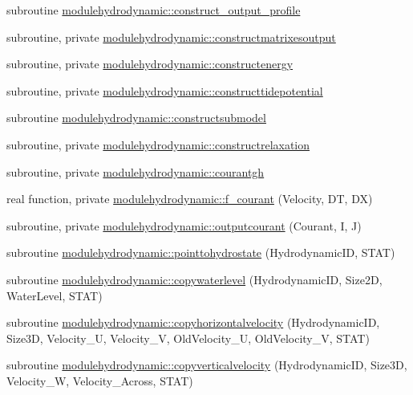\begin{DoxyCompactItemize}
subroutine \mbox{\hyperlink{namespacemodulehydrodynamic_aa3b8aa943159cc40b65537cff1888b6e}{modulehydrodynamic\+::construct\+\_\+output\+\_\+profile}}
\item 
subroutine, private \mbox{\hyperlink{namespacemodulehydrodynamic_a40ae80918927a7eb25c954cec3bd2b40}{modulehydrodynamic\+::constructmatrixesoutput}}
\item 
subroutine, private \mbox{\hyperlink{namespacemodulehydrodynamic_a048299b4cfb1c4c013ad653ff9e85f70}{modulehydrodynamic\+::constructenergy}}
\item 
subroutine, private \mbox{\hyperlink{namespacemodulehydrodynamic_a2a52e863aeb7df55203e4f6646d9b4a5}{modulehydrodynamic\+::constructtidepotential}}
\item 
subroutine \mbox{\hyperlink{namespacemodulehydrodynamic_a2892f053e17fe9b586d237a8b6684326}{modulehydrodynamic\+::constructsubmodel}}
\item 
subroutine, private \mbox{\hyperlink{namespacemodulehydrodynamic_ac37871a130f9232cb11f29fc34327f44}{modulehydrodynamic\+::constructrelaxation}}
\item 
subroutine, private \mbox{\hyperlink{namespacemodulehydrodynamic_a6effd02220d9411965b29d5f27b26d92}{modulehydrodynamic\+::courantgh}}
\item 
real function, private \mbox{\hyperlink{namespacemodulehydrodynamic_a752353d6a88048109cbe1a037fe56ef7}{modulehydrodynamic\+::f\+\_\+courant}} (Velocity, DT, DX)
\item 
subroutine, private \mbox{\hyperlink{namespacemodulehydrodynamic_afd382f82c852a1679b370aaa578e6ce2}{modulehydrodynamic\+::outputcourant}} (Courant, I, J)
\item 
subroutine \mbox{\hyperlink{namespacemodulehydrodynamic_a132ea2e90b030b8a52c174eec61093e2}{modulehydrodynamic\+::pointtohydrostate}} (Hydrodynamic\+ID, S\+T\+AT)
\item 
subroutine \mbox{\hyperlink{namespacemodulehydrodynamic_a6a39453a1be66896cddce62126fa7bcc}{modulehydrodynamic\+::copywaterlevel}} (Hydrodynamic\+ID, Size2D, Water\+Level, S\+T\+AT)
\item 
subroutine \mbox{\hyperlink{namespacemodulehydrodynamic_af9f7b027775cfbeb5d359cec2be0b0ad}{modulehydrodynamic\+::copyhorizontalvelocity}} (Hydrodynamic\+ID, Size3D, Velocity\+\_\+U, Velocity\+\_\+V, Old\+Velocity\+\_\+U, Old\+Velocity\+\_\+V, S\+T\+AT)
\item 
subroutine \mbox{\hyperlink{namespacemodulehydrodynamic_a8d99754e0f222c6f691a79e16a3b85b5}{modulehydrodynamic\+::copyverticalvelocity}} (Hydrodynamic\+ID, Size3D, Velocity\+\_\+W, Velocity\+\_\+\+Across, S\+T\+AT)

\end{DoxyCompactItemize}

